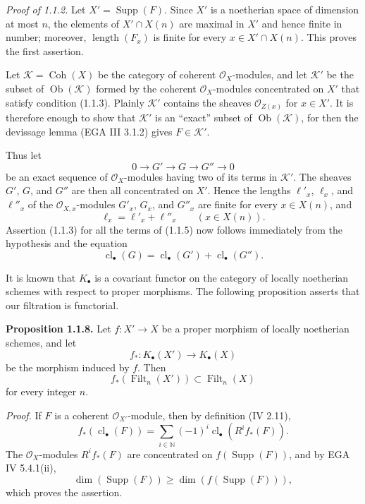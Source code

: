 \documentclass[11pt]{article}
\providecommand{\Filt}{\operatorname{Filt}}
\providecommand{\Coh}{\operatorname{Coh}}
\providecommand{\Supp}{\operatorname{Supp}}
\providecommand{\longg}{\operatorname{length}}
\providecommand{\cl}{\operatorname{cl}}
\begin{document}
\emph{Proof of 1.1.2.}
Let $X'=\Supp(F)$. Since $X'$ is a noetherian space of dimension at most $n$,
the elements of $X'\cap X(n)$ are maximal in $X'$ and hence finite in number;
moreover, $\longg(F_x)$ is finite for every $x\in X'\cap X(n)$. This proves
the first assertion.

Let $\mathcal K=\Coh(X)$ be the category of coherent $\mathcal O_X$-modules,
and let $\mathcal K'$ be the subset of $\operatorname{Ob}(\mathcal K)$ formed
by the coherent $\mathcal O_X$-modules concentrated on $X'$ that satisfy
condition (1.1.3). Plainly $\mathcal K'$ contains the sheaves
$\mathcal O_{Z(x)}$ for $x\in X'$. It is therefore enough to show that
$\mathcal K'$ is an ``exact'' subset of $\operatorname{Ob}(\mathcal K)$,
for then the devissage lemma (EGA III 3.1.2) gives $F\in\mathcal K'$.

Thus let
\begin{equation}\tag{1.1.5}
0\longrightarrow G'\longrightarrow G\longrightarrow G''\longrightarrow0
\end{equation}
be an exact sequence of $\mathcal O_X$-modules having two of its terms in
$\mathcal K'$. The sheaves $G'$, $G$, and $G''$ are then all concentrated on
$X'$. Hence the lengths $\ell'_x$, $\ell_x$, and $\ell''_x$ of the
$\mathcal O_{X,x}$-modules $G'_x$, $G_x$, and $G''_x$ are finite for every
$x\in X(n)$, and
\begin{equation}\tag{1.1.6}
\ell_x=\ell'_x+\ell''_x\qquad(x\in X(n)).
\end{equation}
Assertion (1.1.3) for all the terms of (1.1.5) now follows immediately from
the hypothesis and the equation
\begin{equation}\tag{1.1.7}
\cl_\bullet(G)=\cl_\bullet(G')+\cl_\bullet(G'').
\end{equation}

It is known that $K_\bullet$ is a covariant functor on the category of locally
noetherian schemes with respect to proper morphisms. The following proposition
asserts that our filtration is functorial.

\textbf{Proposition 1.1.8.}
Let $f:X'\to X$ be a proper morphism of locally noetherian schemes, and let
\[
f_*:K_\bullet(X')\longrightarrow K_\bullet(X)
\]
be the morphism induced by $f$. Then
\begin{equation}\tag{1.1.9}
f_*(\Filt_n(X'))\subset\Filt_n(X)
\end{equation}
for every integer $n$.

\emph{Proof.}
If $F$ is a coherent $\mathcal O_{X'}$-module, then by definition (IV 2.11),
\[
f_*(\cl_\bullet(F))=
\sum_{i\in\mathbb N}(-1)^i\cl_\bullet(R^if_*(F)).
\]
The $\mathcal O_X$-modules $R^if_*(F)$ are concentrated on
$f(\Supp(F))$, and by EGA IV 5.4.1(ii),
\[
\dim(\Supp(F))\geq\dim(f(\Supp(F))),
\]
which proves the assertion.
\end{document}
